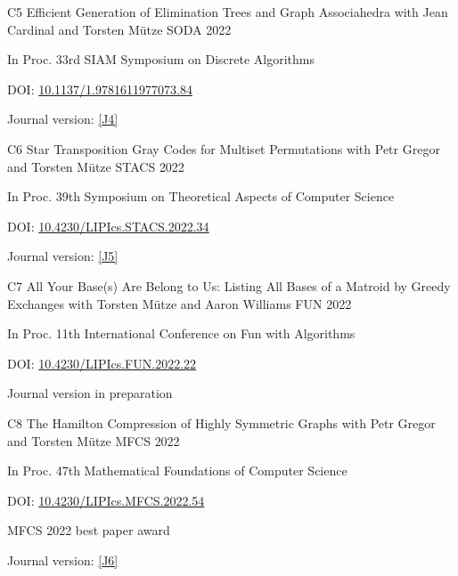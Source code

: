 \begin{cvpublication}
	{C5}
	{Efficient Generation of Elimination Trees and Graph Associahedra}
	{with Jean Cardinal and Torsten Mütze}
	{SODA}
	{2022}
    {
	\begin{cvitems}
	\item In Proc. 33rd SIAM Symposium on Discrete Algorithms
	\item[] DOI: \href{https://doi.org/10.1137/1.9781611977073.84}{10.1137/1.9781611977073.84}
	\item Journal version: \hyperlink{paperC4}{[J4]}
	\end{cvitems}
	}
\end{cvpublication}
\begin{cvpublication}
	{C6}
	{Star Transposition Gray Codes for Multiset Permutations}
	{with Petr Gregor and Torsten Mütze}
	{STACS}
	{2022}
    {
	\begin{cvitems}
	\item In Proc. 39th Symposium on Theoretical Aspects of Computer Science
	\item[] DOI: \href{https://doi.org/10.4230/LIPIcs.STACS.2022.34}{10.4230/LIPIcs.STACS.2022.34}
	\item Journal version: \hyperlink{paperC5}{[J5]}
	\end{cvitems}
	}
\end{cvpublication}
\begin{cvpublication}
	{C7}
	{All Your Base(s) Are Belong to Us: Listing All Bases of a Matroid by Greedy Exchanges}
	{with Torsten Mütze and Aaron Williams}
	{FUN}
	{2022}
    {
	\begin{cvitems}
	\item In Proc. 11th International Conference on Fun with Algorithms
	\item[] DOI: \href{https://doi.org/10.4230/LIPIcs.FUN.2022.22}{10.4230/LIPIcs.FUN.2022.22}
	\item Journal version in preparation
	\end{cvitems}
	}
\end{cvpublication}
\begin{cvpublication}
	{C8}
	{The Hamilton Compression of Highly Symmetric Graphs}
	{with Petr Gregor and Torsten Mütze}
	{MFCS}
	{2022}
    {
	\begin{cvitems}
	\item In Proc. 47th Mathematical Foundations of Computer Science
	\item[] DOI: \href{https://doi.org/10.4230/LIPIcs.MFCS.2022.54}{10.4230/LIPIcs.MFCS.2022.54}
	\item[] MFCS 2022 best paper award
	\item Journal version: \hyperlink{paperC6}{[J6]}
	\end{cvitems}
	}
\end{cvpublication}
